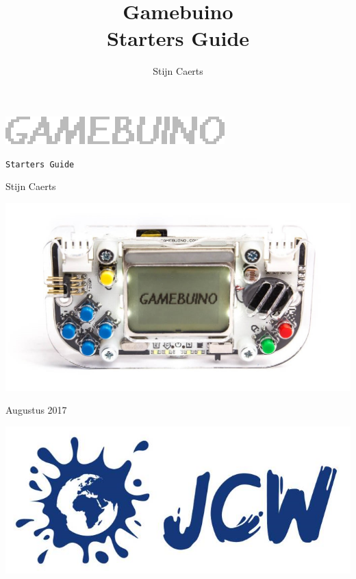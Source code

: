 \documentclass[a4paper,titlepage,12pt]{article}
\title{Gamebuino\\ \small{Starters Guide}}
\author{Stijn Caerts}
\begin{document}
	\begin{titlepage}
		\begin{center}
			\includegraphics{assets/img/gamebuino_logo.png}
			
			\vspace{0.7cm}
			
			\texttt{Starters Guide}
			
			\vspace{2cm}
			
			Stijn Caerts

			\vspace{2cm}
			
			\includegraphics[width=\linewidth]{assets/img/gamebuino-console.jpg}
			
			\vfill
			
			\begin{minipage}{0,45\textwidth}
				\tiny{Augustus 2017}
			\end{minipage}
			\begin{minipage}{0,45\textwidth}
				\begin{flushright}
					\includegraphics[scale=0.5]{assets/img/JCW.png}
				\end{flushright}
			\end{minipage}
			
		\end{center}
		
		
		
	\end{titlepage}
	\tableofcontents
	\newpage
	
\end{document}
